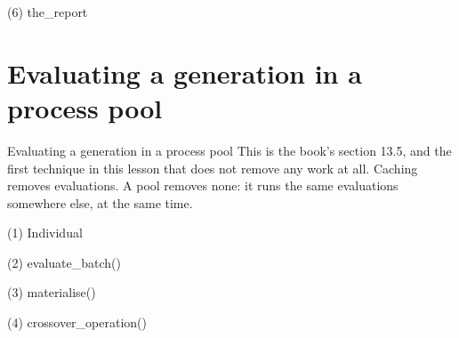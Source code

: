 \begin{frame}[fragile]{(6) the\_report}

\end{frame}


\section{Evaluating a generation in a process pool}

\begin{frame}{Evaluating a generation in a process pool}
This is the book's section 13.5, and the first technique in this lesson that
does not remove any work at all. Caching removes evaluations. A pool removes
none: it runs the same evaluations somewhere else, at the same time.
\end{frame}

\begin{frame}[fragile]{(1) Individual}

\end{frame}

\begin{frame}[fragile]{(2) evaluate\_batch()}

\end{frame}

\begin{frame}[fragile]{(3) materialise()}

\end{frame}

\begin{frame}[fragile]{(4) crossover\_operation()}

\end{frame}

